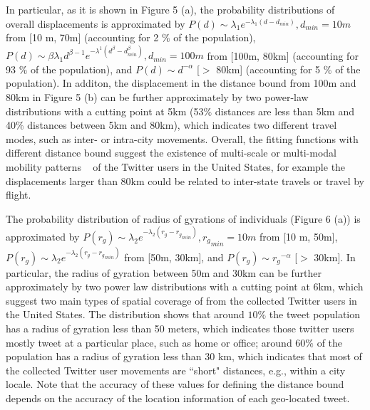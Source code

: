 \documentclass[a4paper, 11pt]{article}
\begin{document}
In particular, as it is shown in Figure 5 (a), the probability distributions of overall displacements is approximated by $P(d) \sim \lambda_{1} e^{-\lambda_{1}(d - d_{min})}, d_{min}=10m$ from [10 m, 70m] (accounting for 2 $\%$ of the population),  $ P(d) \sim \beta\lambda_{1}d^{\beta-1}e^{-\lambda^{1}(d^\beta-d_{min}^\beta)}, d_{min} = 100m$ from [100m, 80km] (accounting for 93 $\%$ of the population), and $P(d) \sim {d}^{-\alpha}$ [$>$ 80km] (accounting for 5 $\%$ of the population). In additon, the displacement in the distance bound from 100m and 80km in Figure 5 (b) can be further approximately by two power-law distributions with a cutting point at 5km (53$\%$ distances are less than 5km and 40$\%$ distances between 5km and 80km), which indicates two different travel modes, such as inter- or intra-city movements.
Overall, the fitting functions with different distance bound suggest the existence of multi-scale or multi-modal mobility patterns ~\citep{Jurdak2015} of the Twitter users in the United States, for example the displacements larger than 80km could be related to inter-state travels or travel by flight. 

The probability distribution of radius of gyrations of individuals (Figure 6 (a)) is approximated by $P(r_{g}) \sim \lambda_{2} e^{-\lambda_{2}(r_{g} - {r_{g}}_{min})}, {r_{g}}_{min}=10m$ from [10 m, 50m], $P(r_{g}) \sim \lambda_{2} e^{-\lambda_{2}(r_{g} - {r_{g}}_{min})}$ from [50m, 30km], and $P(r_{g}) \sim {r_{g}}^{-\alpha}$ [$>$ 30km]. In particular, the radius of gyration between 50m and 30km can be further approximately by two power law distributions with a cutting point at 6km, which suggest two main types of spatial coverage of from the collected Twitter users in the United States. The distribution shows that around $10\%$ the tweet population has a radius of gyration less than 50 meters, which indicates those twitter users mostly tweet at a particular place, such as home or office;  around 60$\%$ of the population has a radius of gyration less than 30 km, which indicates that most of the collected Twitter user movements are ``short" distances, e.g., within a city locale. Note that the accuracy of these values for defining the distance bound depends on the accuracy of the location information of each geo-located tweet. 
\end{document}
